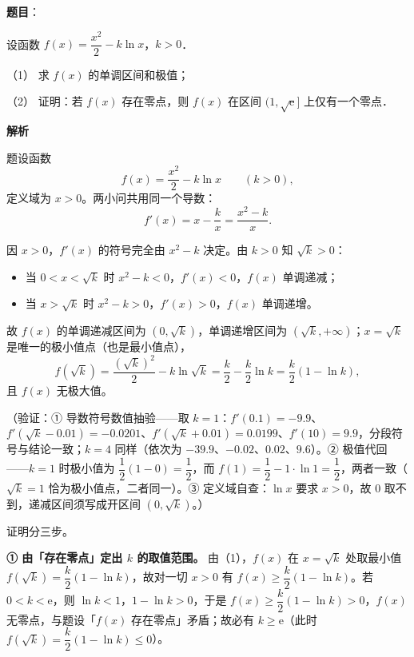\begin{answer}

\textbf{题目}：

设函数 \(f(x)=\dfrac{x^{2}}{2}-k\ln x\)，\(k>0\)．

（1） 求 \(f(x)\) 的单调区间和极值；

（2） 证明：若 \(f(x)\) 存在零点，则 \(f(x)\) 在区间 \((1,\sqrt{\mathrm{e}}]\) 上仅有一个零点．

\textbf{解析}

题设函数
\nopagebreak[4]
\[
f(x)=\frac{x^{2}}{2}-k\ln x\qquad(k>0),
\]
定义域为 \(x>0\)。两小问共用同一个导数：
\nopagebreak[4]
\[
f'(x)=x-\frac{k}{x}=\frac{x^{2}-k}{x}.
\]


因 \(x>0\)，\(f'(x)\) 的符号完全由 \(x^{2}-k\) 决定。由 \(k>0\) 知 \(\sqrt{k}>0\)：

\begin{itemize}
\item 当 \(0<x<\sqrt{k}\) 时 \(x^{2}-k<0\)，\(f'(x)<0\)，\(f(x)\) 单调递减；
\item 当 \(x>\sqrt{k}\) 时 \(x^{2}-k>0\)，\(f'(x)>0\)，\(f(x)\) 单调递增。
\end{itemize}

故 \(f(x)\) 的单调递减区间为 \(\left(0,\sqrt{k}\right)\)，单调递增区间为 \(\left(\sqrt{k},+\infty\right)\)；\(x=\sqrt{k}\) 是唯一的极小值点（也是最小值点），
\nopagebreak[4]
\[
f\left(\sqrt{k}\right)=\frac{\left(\sqrt{k}\right)^{2}}{2}-k\ln\sqrt{k}=\frac{k}{2}-\frac{k}{2}\ln k=\frac{k}{2}(1-\ln k),
\]
且 \(f(x)\) 无极大值。

（验证：① 导数符号数值抽验——取 \(k=1\)：\(f'(0.1)=-9.9\)、\(f'\left(\sqrt{k}-0.01\right)=-0.0201\)、\(f'\left(\sqrt{k}+0.01\right)=0.0199\)、\(f'(10)=9.9\)，分段符号与结论一致；\(k=4\) 同样（依次为 \(-39.9\)、\(-0.02\)、\(0.02\)、\(9.6\)）。② 极值代回——\(k=1\) 时极小值为 \(\dfrac{1}{2}(1-0)=\dfrac{1}{2}\)，而 \(f(1)=\dfrac{1}{2}-1\cdot\ln1=\dfrac{1}{2}\)，两者一致（\(\sqrt{k}=1\) 恰为极小值点，二者同一）。③ 定义域自查：\(\ln x\) 要求 \(x>0\)，故 \(0\) 取不到，递减区间须写成开区间 \(\left(0,\sqrt{k}\right)\)。）


证明分三步。

\textbf{① 由「存在零点」定出 \(k\) 的取值范围。} 由（1），\(f(x)\) 在 \(x=\sqrt{k}\) 处取最小值 \(f\left(\sqrt{k}\right)=\dfrac{k}{2}(1-\ln k)\)，故对一切 \(x>0\) 有 \(f(x)\geqslant\dfrac{k}{2}(1-\ln k)\)。若 \(0<k<\mathrm{e}\)，则 \(\ln k<1\)，\(1-\ln k>0\)，于是 \(f(x)\geqslant\dfrac{k}{2}(1-\ln k)>0\)，\(f(x)\) 无零点，与题设「\(f(x)\) 存在零点」矛盾；故必有 \(k\geqslant\mathrm{e}\)（此时 \(f\left(\sqrt{k}\right)=\dfrac{k}{2}(1-\ln k)\leqslant0\)）。


\end{answer}
